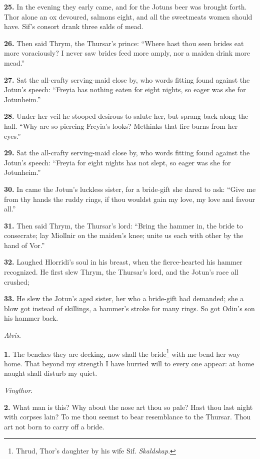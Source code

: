 \textbf{25.} In the evening they early came, and for the Jotuns beer was
brought forth. Thor alone an ox devoured, salmons eight, and all the
sweetmeats women should have. Sif's consort drank three salds of mead.

\textbf{26.} Then said Thrym, the Thursar's prince: ``Where hast thou seen
brides eat more voraciously? I never saw brides feed more amply, nor a
maiden drink more mead.''

\textbf{27.} Sat the all-crafty serving-maid close by, who words fitting
found against the Jotun's speech: ``Freyia has nothing eaten for eight
nights, so eager was she for Jotunheim.''

\textbf{28.} Under her veil he stooped desirous to salute her, but sprang
back along the hall. ``Why are so piercing Freyia's looks? Methinks
that fire burns from her eyes.''

\textbf{29.} Sat the all-crafty serving-maid close by, who words fitting
found against the Jotun's speech: ``Freyia for eight nights has not
slept, so eager was she for Jotunheim.''

\textbf{30.} In came the Jotun's luckless sister, for a bride-gift she dared
to ask: ``Give me from thy hands the ruddy rings, if thou wouldst gain
my love, my love and favour all.''

\textbf{31.} Then said Thrym, the Thursar's lord: ``Bring the hammer in, the
bride to consecrate; lay Miollnir on the maiden's knee; unite us each
with other by the hand of Vor.''

\textbf{32.} Laughed Hlorridi's soul in his breast, when the fierce-hearted
his hammer recognized. He first slew Thrym, the Thursar's lord, and
the Jotun's race all crushed;

\textbf{33.} He slew the Jotun's aged sister, her who a bride-gift had
demanded; she a blow got instead of skillings, a hammer's stroke for
many rings. So got Odin's son his hammer back.


\emph{Alvis}.

\textbf{1.} The benches they are decking, now shall the bride\footnote{Thrud, Thor's daughter by his wife Sif. \emph{Skaldskap}.} with me
bend her way home. That beyond my strength I have hurried will to
every one appear: at home naught shall disturb my quiet.

\emph{Vingthor}.

\textbf{2.} What man is this? Why about the nose art thou so pale? Hast thou
last night with corpses lain? To me thou seemst to bear resemblance to
the Thursar. Thou art not born to carry off a bride.

